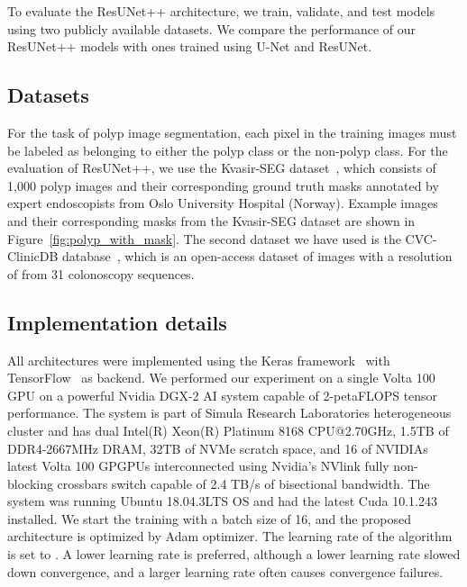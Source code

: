 \documentclass[conference]{IEEEtran}
\newcommand{\resunetplusplus}{ResUNet++\xspace}
\begin{document}
To evaluate the \resunetplusplus architecture, we train, validate, and test models using two publicly available datasets. We compare the performance of our \resunetplusplus models with ones trained using U-Net and ResUNet.
 
\subsection{Datasets}
For the task of polyp image segmentation, each pixel in the training images must be labeled as belonging to either the polyp class or the non-polyp class. For the evaluation of \resunetplusplus, we use the Kvasir-SEG dataset~\cite{debeshkvasir-SEG}, which consists of 1,000 polyp images and their corresponding ground truth masks annotated by expert endoscopists from Oslo University Hospital (Norway). Example images and their corresponding masks from the Kvasir-SEG dataset are shown in Figure~\ref{fig:polyp_with_mask}. The second dataset we have used is the CVC-ClinicDB database~\cite{bernal2015wm}, which is an open-access dataset of  images with a resolution of  from 31 colonoscopy sequences.
\subsection{Implementation details}
All architectures were implemented using the Keras framework~\cite{chollet2015keras} with TensorFlow~\cite{abadi2016tensorflow} as backend. We performed our experiment on a single Volta 100 GPU on a powerful Nvidia DGX-2 AI system capable of 2-petaFLOPS tensor performance. The system is part of Simula Research Laboratories heterogeneous cluster and has dual Intel(R) Xeon(R) Platinum 8168 CPU@2.70GHz, 1.5TB of DDR4-2667MHz DRAM, 32TB of NVMe scratch space, and 16 of NVIDIAs latest Volta 100 GPGPUs interconnected using Nvidia's NVlink fully non-blocking crossbars switch capable of 2.4 TB/s of bisectional bandwidth. The system was running Ubuntu 18.04.3LTS OS and had the latest Cuda 10.1.243 installed. We start the training with a batch size of 16, and the proposed architecture is optimized by Adam optimizer. The learning rate of the algorithm is set to . A lower learning rate is preferred, although a lower learning rate slowed down convergence, and a larger learning rate often causes convergence failures. 
\end{document}
